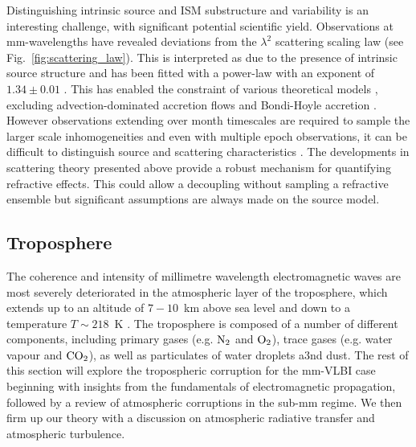 Distinguishing intrinsic source and ISM substructure and variability is an interesting challenge, with significant potential scientific yield. Observations at mm-wavelengths have revealed deviations from the $\lambda^2$ scattering scaling law (see Fig.~\ref{fig:scattering_law}). This is interpreted as due to the presence of intrinsic source structure and has been fitted with a power-law with an exponent of $1.34 \pm 0.01$ \citep{Lu_2011}. This has enabled the constraint of various theoretical models \cite{Bower_2006}, excluding advection-dominated accretion flows \citep[(ADAF),][]{Narayan_1995} and Bondi-Hoyle accretion \citep{Melia_1994}. However observations extending over month timescales are required to sample the larger scale inhomogeneities and even with multiple epoch observations, it can be difficult to distinguish source and scattering characteristics \citep*{Macquart_2006}. The developments in scattering theory presented above provide a robust mechanism for quantifying refractive effects. This could allow a decoupling without sampling a refractive ensemble but significant assumptions are always made on the source model. 


\subsection{Troposphere}\label{sec:trop}

The coherence and intensity of millimetre wavelength electromagnetic waves are most severely deteriorated in the atmospheric layer of the troposphere, which extends up to an altitude of $7-10$~km above sea level and down to a temperature $T \sim 218$~K \citep{Thompson_2001}. The troposphere is composed of a number of different components, including primary gases (e.g. $\rm N_2$ and  $\rm O_2$), trace gases (e.g. water vapour and ${\rm CO_2}$), as well as particulates of water droplets a3nd dust. The rest of this section will explore the tropospheric corruption for the mm-VLBI case beginning with insights from the fundamentals of electromagnetic propagation, followed by a review of atmospheric corruptions in the sub-mm regime. We then firm up our theory with a discussion on atmospheric radiative transfer and atmospheric turbulence. 


